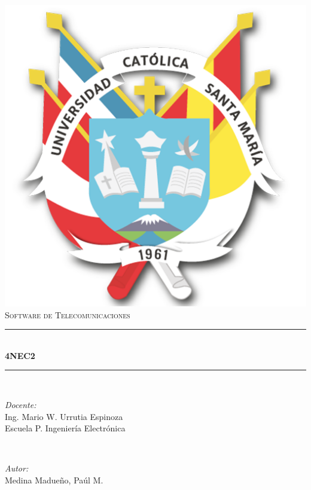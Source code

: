 \documentclass[11pt,a4paper]{article}
\begin{document}
\renewcommand{\refname}{BIBLIOGRAFÍA}


\begin{titlepage}
		\newcommand{\HRule}{\rule{\linewidth}{0.5mm}}
		\center 
		\includegraphics[scale=0.5]{images/ucsm.png}\\[1cm]
		\textsc{\LARGE Software de Telecomunicaciones}\\[0.5cm]  
		
		\HRule \\[0.5cm]
		{\huge \bfseries 4NEC2}\\[0.5cm]
		
		\HRule \\[0.5cm]
		
		\begin{minipage}{0.5\textwidth}
		\begin{flushleft} \large
			\emph{Docente:}\\
			Ing. Mario W. Urrutia Espinoza\\
            Escuela P. Ingeniería Electrónica\\
		\end{flushleft}
			\end{minipage}~
			\begin{minipage}{0.4\textwidth}
            
		\begin{flushright} \large
			\emph{Autor:} \\
			Medina Madueño, Paúl M.\\
		\end{flushright}
     
	\end{minipage}\\[2 cm]
		\vfill 
\end{titlepage}
\thinspace
\tableofcontents
\listoffigures
\newpage
\end{document}
